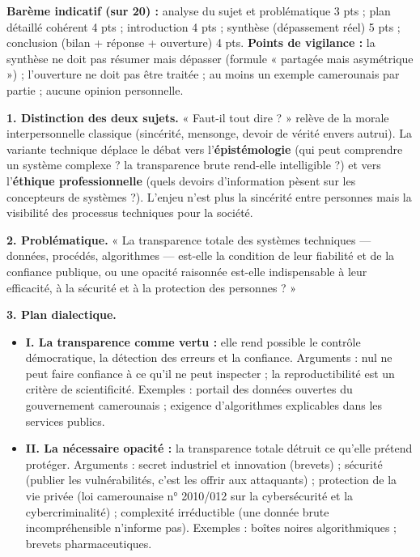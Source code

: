 \documentclass[11pt]{article}
\begin{document}
\begin{corrige}
\textbf{Barème indicatif (sur 20) :} analyse du sujet et problématique 3 pts ; plan détaillé cohérent 4 pts ; introduction 4 pts ; synthèse (dépassement réel) 5 pts ; conclusion (bilan + réponse + ouverture) 4 pts.
\textbf{Points de vigilance :} la synthèse ne doit pas résumer mais dépasser (formule « partagée mais asymétrique ») ; l'ouverture ne doit pas être traitée ; au moins un exemple camerounais par partie ; aucune opinion personnelle.
\end{corrige}

\begin{corrige}
\textbf{1. Distinction des deux sujets.} « Faut-il tout dire ? » relève de la morale interpersonnelle classique (sincérité, mensonge, devoir de vérité envers autrui). La variante technique déplace le débat vers l'\textbf{épistémologie} (qui peut comprendre un système complexe ? la transparence brute rend-elle intelligible ?) et vers l'\textbf{éthique professionnelle} (quels devoirs d'information pèsent sur les concepteurs de systèmes ?). L'enjeu n'est plus la sincérité entre personnes mais la visibilité des processus techniques pour la société.\par
\textbf{2. Problématique.} « La transparence totale des systèmes techniques — données, procédés, algorithmes — est-elle la condition de leur fiabilité et de la confiance publique, ou une opacité raisonnée est-elle indispensable à leur efficacité, à la sécurité et à la protection des personnes ? »\par
\textbf{3. Plan dialectique.}
\begin{itemize}
    \item \textbf{I. La transparence comme vertu :} elle rend possible le contrôle démocratique, la détection des erreurs et la confiance. Arguments : nul ne peut faire confiance à ce qu'il ne peut inspecter ; la reproductibilité est un critère de scientificité. Exemples : portail des données ouvertes du gouvernement camerounais ; exigence d'algorithmes explicables dans les services publics.
    \item \textbf{II. La nécessaire opacité :} la transparence totale détruit ce qu'elle prétend protéger. Arguments : secret industriel et innovation (brevets) ; sécurité (publier les vulnérabilités, c'est les offrir aux attaquants) ; protection de la vie privée (loi camerounaise n° 2010/012 sur la cybersécurité et la cybercriminalité) ; complexité irréductible (une donnée brute incompréhensible n'informe pas). Exemples : boîtes noires algorithmiques ; brevets pharmaceutiques.

\end{itemize}
\end{corrige}
\end{document}
